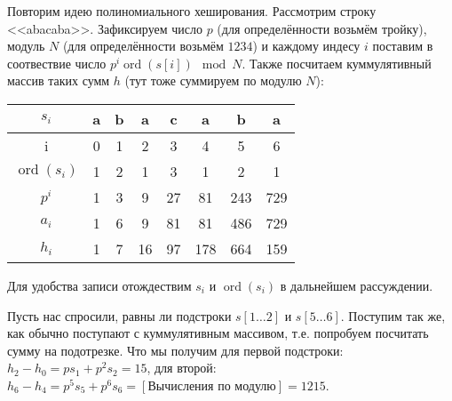 \documentclass[addpoints]{exam}
\DeclareMathOperator{\ord}{ord}
\DeclareMathOperator{\suf}{suf}
\begin{document}
\begin{questions}

\begin{solution}

Повторим идею полиномиального хеширования. Рассмотрим строку <<abacaba>>. Зафиксируем число $p$ (для определённости возьмём тройку), модуль $N$ (для определённости возьмём $1234$) и каждому индесу $i$ поставим в соотвествие число $p^i \ord(s[i]) \mod N$. Также посчитаем куммулятивный массив таких сумм $h$ (тут тоже суммируем по модулю $N$):

\begin{center}
\begin{tabular}{|c|c|c|c|c|c|c|c|}
\hline 
$s_i$ & a & b & a & c & a & b & a \\ 
\hline 
i & 0 & 1 & 2 & 3 & 4 & 5 & 6 \\ 
\hline 
$\ord(s_i)$ & 1 & 2 & 1 & 3 & 1 & 2 & 1 \\ 
\hline 
$p^i$ & 1 & 3 & 9 & 27 & 81 & 243 & 729 \\ 
\hline 
$a_i$ & 1 & 6 & 9 & 81 & 81 & 486 & 729 \\ 
\hline 
$h_i$ & 1 & 7 & 16 & 97 & 178 & 664 & 159 \\ 
\hline 
\end{tabular} 
\end{center}

Для удобства записи отождествим $s_i$ и $\ord(s_i)$ в дальнейшем рассуждении.

Пусть нас спросили, равны ли подстроки $s[1 \ldots 2]$ и $s[5 \ldots 6]$. Поступим так же, как обычно поступают с куммулятивным массивом, т.е. попробуем посчитать сумму на подотрезке. Что мы получим для первой подстроки: $h_2 - h_0 = p s_1 + p^2 s_2 = 15$, для второй: $h_6-h_4 = p^5 s_5 + p^6 s_6 = \left[\mbox{Вычисления по модулю}\right] = 1215$. 


\end{solution}
\end{questions}
\end{document}
